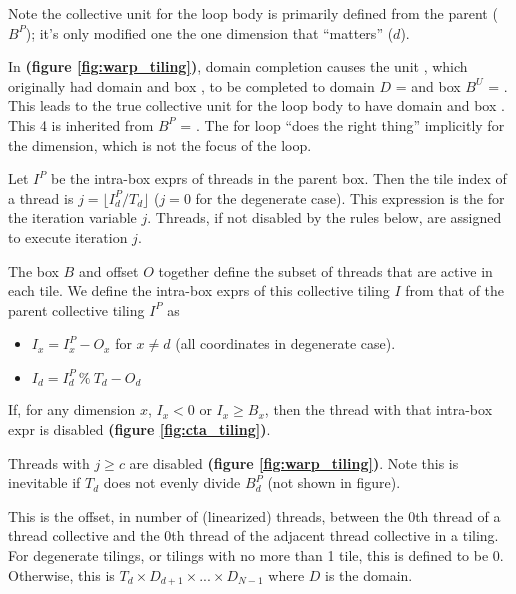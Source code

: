 \filbreak
Note the collective unit for the loop body is primarily defined from the parent ($B^P$); it's only modified one the one dimension that ``matters'' ($d$).

\filbreak
In \textbf{(figure \ref{fig:warp_tiling})}, domain completion causes the unit , which originally had domain  and box , to be completed to domain $D$ =  and box $B^U$ = .
This leads to the true collective unit for the loop body to have domain  and box .
This 4 is inherited from $B^P$ = .
The for loop ``does the right thing'' implicitly for the  dimension, which is not the focus of the  loop.

\filbreak
{} Let $I^P$ be the intra-box exprs of threads in the parent box.
Then the tile index of a thread is $j = \lfloor I^P_d / T_d \rfloor$ ($j = 0$ for the degenerate case).
This expression is the  for the iteration variable $j$.
Threads, if not disabled by the rules below, are assigned to execute iteration $j$.

\filbreak
{} The box $B$ and offset $O$ together define the subset of threads that are active in each tile.
We define the intra-box exprs of this collective tiling $I$ from that of the parent collective tiling $I^P$ as
\begin{itemize}
  \item $I_x = I^P_x - O_x$ for $x \ne d$ (all coordinates in degenerate case).
  \item $I_d = I^P_d~\%~T_d - O_d$
\end{itemize}
If, for any dimension $x$, $I_x < 0$ or $I_x \ge B_x$, then the thread with that intra-box expr is disabled
\textbf{(figure \ref{fig:cta_tiling})}.

\filbreak
{} Threads with $j \ge c$ are disabled \textbf{(figure \ref{fig:warp_tiling})}.
Note this is inevitable if $T_d$ does not evenly divide $B^P_d$ (not shown in figure).

\filbreak
{} This is the offset, in number of (linearized) threads, between the 0th thread of a thread collective and the 0th thread of the adjacent thread collective in a tiling.
For degenerate tilings, or tilings with no more than 1 tile, this is defined to be 0.
Otherwise, this is $T_d \times D_{d+1} \times ... \times D_{N-1}$ where $D$ is the domain.


